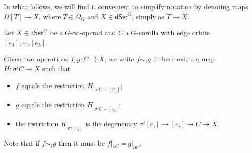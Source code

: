 \documentclass[a4paper,10pt
,draft
]{article}%
\renewcommand{\1}{\eta}%
\begin{document}
In what follows, we will find it convenient to simplify notation by denoting maps $\Omega[T] \to X$,
where $T \in \Omega_G$ and $X \in \mathsf{dSet}^G$,
simply as $T \to X$.


\begin{definition}
	Let $X \in \mathsf{dSet}^G$ be a $G$-$\infty$-operad and $C$ a $G$-corolla with edge orbits
	$[e_0],\cdots,[e_k]$.
	
	Given two operations 
	$f,g\colon C \rightrightarrows X$,
	we write $f \sim_i g$ if there exists a map
	$H \colon \sigma^i C \to X$ such that
\begin{itemize}
\item $f$ equals the restriction $H|_{\sigma^i C-[e'_i]}$;
\item $g$ equals the restriction $H|_{\sigma^i C-[e_i]}$;
\item the restriction $H|_{\sigma^i [e_i]}$
is the degeneracy $\sigma^i [e_i] \to [e_i] \to C \to X$.
\end{itemize}
\end{definition}


\begin{remark}\label{HOMOTBOUND REM}
	Note that if $f \sim_i g$ then it must be
	$f|_{\partial C} = g|_{\partial C}$.
\end{remark}
\end{document}
